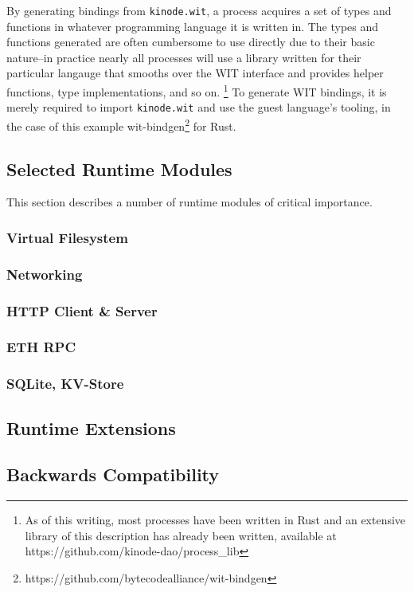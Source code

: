 \documentclass[runningheads]{llncs}
\begin{document}
By generating bindings from \verb|kinode.wit|, a process acquires a set of types and functions in whatever programming language it is written in.
The types and functions generated are often cumbersome to use directly due to their basic nature–in practice nearly all processes will use a library written for their particular langauge that smooths over the WIT interface and provides helper functions, type implementations, and so on.
\footnote{ As of this writing, most processes have been written in Rust and an extensive library of this description has already been written, available at https://github.com/kinode-dao/process\_lib }
To generate WIT bindings, it is merely required to import \verb|kinode.wit| and use the guest language's tooling, in the case of this example wit-bindgen\footnote{https://github.com/bytecodealliance/wit-bindgen} for Rust.

\subsection{Selected Runtime Modules}

This section describes a number of runtime modules of critical importance.

\subsubsection{Virtual Filesystem}
\subsubsection{Networking}
\subsubsection{HTTP Client \& Server}
\subsubsection{ETH RPC}
\subsubsection{SQLite, KV-Store}
\subsection{Runtime Extensions}
\subsection{Backwards Compatibility}
%
%
%
\end{document}
